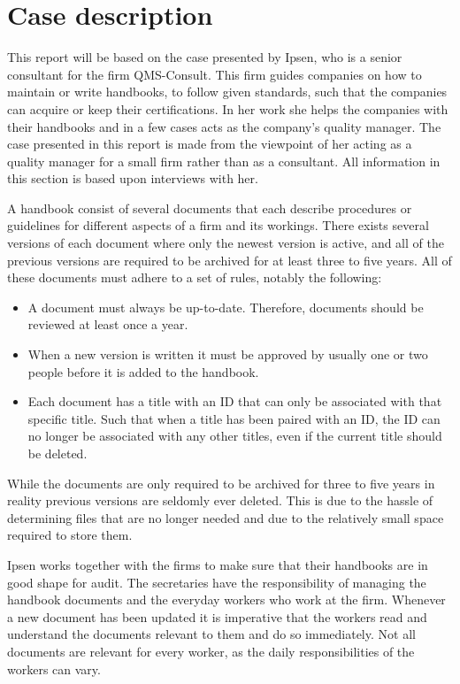 \section{Case description} \label{sec:CaseDescription}

This report will be based on the case presented by Ipsen, who is a senior consultant for the firm QMS-Consult.
This firm guides companies on how to maintain or write handbooks, to follow given standards, such that the companies can acquire or keep their certifications.
In her work she helps the companies with their handbooks and in a few cases acts as the company's quality manager.
The case presented in this report is made from the viewpoint of her acting as a quality manager for a small firm rather than as a consultant.
All information in this section is based upon interviews with her.

A handbook consist of several documents that each describe procedures or guidelines for different aspects of a firm and its workings.
There exists several versions of each document where only the newest version is active, and all of the previous versions are required to be archived for at least three to five years. All of these documents must adhere to a set of rules, notably the following:

\begin{itemize}
	\item
	A document must always be up-to-date.
	Therefore, documents should be reviewed at least once a year.
	\item
	When a new version is written it must be approved by usually one or two people before it is added to the handbook.
	\item
	Each document has a title with an ID that can only be associated with that specific title.
	Such that when a title has been paired with an ID, the ID can no longer be associated with any other titles, even if the current title should be deleted.
\end{itemize}

While the documents are only required to be archived for three to five years in reality previous versions are seldomly ever deleted.
This is due to the hassle of determining files that are no longer needed and due to the relatively small space required to store them.

Ipsen works together with the firms to make sure that their handbooks are in good shape for audit.
The secretaries have the responsibility of managing the handbook documents and the everyday workers who work at the firm.
Whenever a new document has been updated it is imperative that the workers read and understand the documents relevant to them and do so immediately.
Not all documents are relevant for every worker, as the daily responsibilities of the workers can vary.


